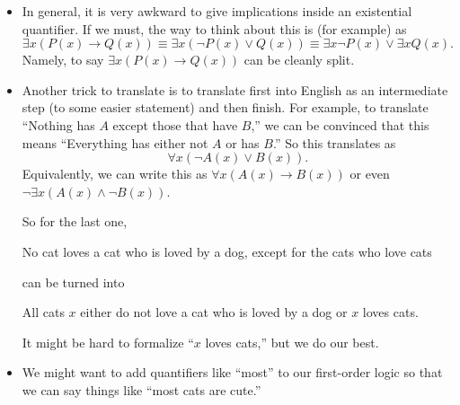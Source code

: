 \documentclass[../notes.tex]{subfiles}
\begin{document}
\begin{itemize}
	\item In general, it is very awkward to give implications inside an existential quantifier. If we must, the way to think about this is (for example) as
	\[\exists x(P(x)\to Q(x))\equiv\exists x(\lnot P(x)\lor Q(x))\equiv\exists x\lnot P(x)\lor\exists xQ(x).\]
	Namely, to say $\exists x(P(x)\to Q(x))$ can be cleanly split.
	\item Another trick to translate is to translate first into English as an intermediate step (to some easier statement) and then finish. For example, to translate ``Nothing has $A$ except those that have $B$,'' we can be convinced that this means ``Everything has either not $A$ or has $B$.'' So this translates as
	\[\forall x(\lnot A(x)\lor B(x)).\]
	Equivalently, we can write this as $\forall x(A(x)\to B(x))$ or even $\lnot\exists x(A(x)\land\lnot B(x))$.

	So for the last one,
	\begin{center}
		No cat loves a cat who is loved by a dog, except for the cats who love cats
	\end{center}
	can be turned into
	\begin{center}
		All cats $x$ either do not love a cat who is loved by a dog or $x$ loves cats.
	\end{center}
	It might be hard to formalize ``$x$ loves cats,'' but we do our best.

	\item We might want to add quantifiers like ``most'' to our first-order logic so that we can say things like ``most cats are cute.''
\end{itemize}
\end{document}
